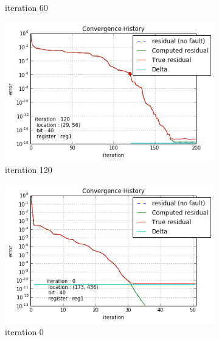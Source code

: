 \begin{figure}[h]
\begin{minipage}[b]{0.48\linewidth}
\begin{subfigure}[t]{\linewidth}
		\caption{iteration 60}\label{fig:gre_216a_conv_hist_iteration_1}
	\end{subfigure}
    \quad
    \begin{subfigure}[t]{\linewidth}
		\centering
		\includegraphics[width=\linewidth]{figures/gre_216a/convergence_history_iteration_2.png}
		\caption{iteration 120}\label{fig:gre_216a_conv_hist_iteration_2}
	\end{subfigure}
    \end{minipage}
    \quad
    \begin{minipage}[b]{0.48\linewidth}
    	\begin{subfigure}[t]{\linewidth}
		\centering
		\includegraphics[width=\linewidth]{figures/pores_2/convergence_history_iteration_0.png}
		\caption{iteration 0}\label{fig:pores_2_conv_hist_iteration_0}		
	\end{subfigure}
	\quad
	\begin{subfigure}[t]{\linewidth}

\end{subfigure}
\end{minipage}
\end{figure}
